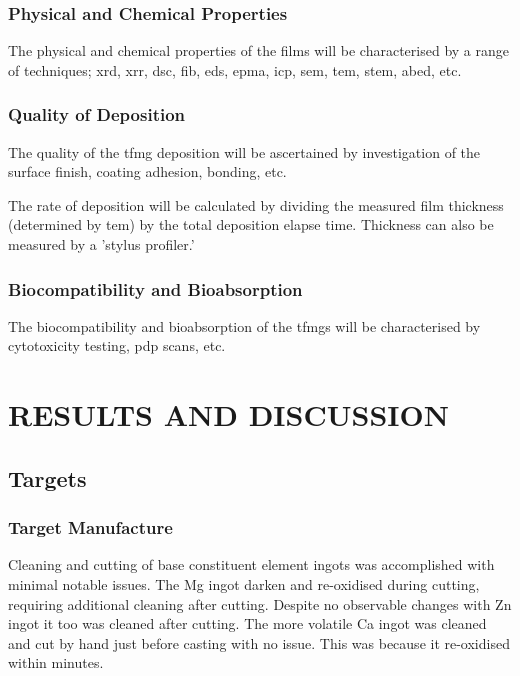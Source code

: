 \documentclass[a4paper,12pt,oneside]{report}%
\begin{document}
\subsection{Physical and Chemical Properties}
The physical and chemical properties of the films will be characterised by a range of techniques; \acrshort{xrd}, \acrshort{xrr}, \acrshort{dsc}, \acrshort{fib}, \acrshort{eds}, \acrshort{epma}, \acrshort{icp}, \acrshort{sem}, \acrshort{tem}, \acrshort{stem}, \acrshort{abed}, etc. 

\subsection{Quality of Deposition} 
The quality of the \gls{tfmg} deposition will be ascertained by investigation of the surface finish, coating adhesion, bonding, etc.

The rate of deposition will be calculated by dividing the measured film thickness (determined by \acrshort{tem}) by the total deposition elapse time. Thickness can also be measured by a 'stylus profiler.'

\subsection{Biocompatibility and Bioabsorption} 
The biocompatibility and bioabsorption of the \glspl{tfmg} will be characterised by cytotoxicity testing, \acrshort{pdp} scans, etc. 


\chapter{RESULTS AND DISCUSSION}
\glsresetall

\section{Targets}
\subsection{Target Manufacture}

Cleaning and cutting of base constituent element ingots was accomplished with minimal notable issues. The Mg ingot darken and re-oxidised during cutting, requiring additional cleaning after cutting. Despite no observable changes with Zn ingot it too was cleaned after cutting. The more volatile Ca ingot was cleaned and cut by hand just before casting with no issue. This was because it re-oxidised within minutes.
\end{document}
